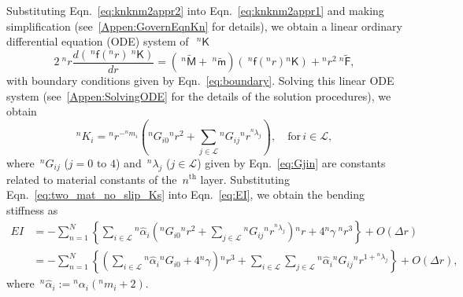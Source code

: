 \documentclass[preprint,10pt,times]{elsarticle}
\numberwithin{equation}{section}
\renewcommand{\u}[1]{\boldsymbol{#1}}
\newcommand{\usf}[1]{\u{\mathsf #1}}
\newcommand{\pr}[1]{\left( #1 \right)}
\renewcommand{\>}{$\Rightarrow$}
\begin{document}
Substituting Eqn.~\eqref{eq:knknm2appr2} into Eqn.~\eqref{eq:knknm2appr1} and making simplification (see~\ref{Appen:GovernEqnKn} for details), we obtain a linear ordinary differential equation (ODE) system of~$~^{n}{\usf{K}}$
\begin{equation}
  2 ~^{n}\!{r} \frac{d \pr{~^{n}\usf{f}({}^{n}\!r)~^{n}{\usf{K}}}}{dr} = \pr{~^{n}\tilde{\usf{M}} + ~^{n}\tilde{\usf{m}}} \pr{~^{n}\usf{f}({}^{n}\!r){}^{n}{\usf{K}}} + {}^{n}\!r^2 ~^{n}\tilde{\usf{F}},
	\label{eq:GovernEqnKn}
\end{equation}
with boundary conditions given by Eqn.~\eqref{eq:boundary}. Solving this linear ODE system (see~\ref{Appen:SolvingODE} for the details of the solution procedures), we obtain
\begin{equation}
{}^{n}\!{K_{i}} = {}^{n}\!{r}^{-{}^{n}\!{m_{i}}} \left( {}^{n}\!G_{i0} {}^{n}\!r^2 + \sum_{j \in \mathcal{L}} {}^{n}\!G_{ij} {}^{n}\!r^{{}^{n}\!\lambda_{j}} \right), \quad \text{for}\, i \in \mathcal{L},
\label{eq:two_mat_no_slip_Ks}
\end{equation}
where~${}^{n}\!G_{ij}$ ($j = \text{0 to 4}$) and~${}^{n}\!\lambda_{j}$ ($j \in \mathcal{L}$) given by Eqn.~\eqref{eq:Gjin} are constants related to material constants of the~$n^{\text{th}}$ layer.
Substituting Eqn.~\eqref{eq:two_mat_no_slip_Ks} into Eqn.~\eqref{eq:EI}, we obtain the bending stiffness as
\begin{equation}
\begin{aligned}
	EI & = - \sum_{n=1}^{N} \left\lbrace \sum_{i \in \mathcal{L}} {}^{n}\!{\hat{\alpha}_{i}} \left( {}^{n}\!G_{i0} {}^{n}\!r^2 + \sum_{j \in \mathcal{L}} {}^{n}\!G_{ij} {}^{n}\!r^{{}^{n}\!\lambda_{j}} \right) {}^{n}\!{r} + 4{}^{n}\!\gamma~ {}^{n}\!{r}^3 \right\rbrace + O(\Delta r) \\
	& =  - \sum_{n=1}^{N} \left\lbrace \left( \sum_{i \in \mathcal{L}} {}^{n}\!{\hat{\alpha}_{i}} {}^{n}\!G_{i0} + 4{}^{n}\!\gamma \right) {}^{n}\!{r}^3+ \sum_{i \in \mathcal{L}} \sum_{j \in \mathcal{L}} {}^{n}\!{\hat{\alpha}_{i}} {}^{n}\!G_{ij} {}^{n}\!r^{1 + {}^{n}\!\lambda_{j}} \right\rbrace + O(\Delta r),
\end{aligned}
\end{equation}
where~${}^{n}\!{\hat{\alpha}_{i}} := {}^{n}\!{\alpha_{i}} \left( {}^{n}\!{m_{i}} + 2\right)$.
\end{document}
